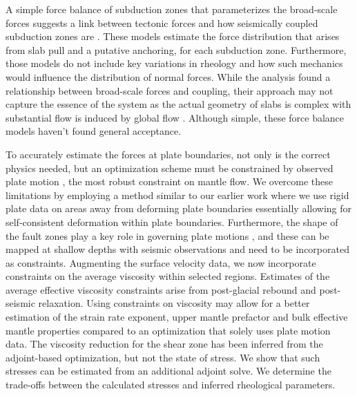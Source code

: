 \documentclass[12pt]{article}
\begin{document}
A simple force balance of subduction zones that parameterizes the broad-scale forces suggests a link between tectonic forces and how seismically coupled subduction zones are \citep{scholz1995mechanism, scholz2012seismic}. These models estimate the force distribution that arises from slab pull and a putative anchoring, for each subduction zone. Furthermore, those models do not include key variations in rheology and how such mechanics would influence the distribution of  normal forces.  While the analysis found a relationship between broad-scale forces and coupling, their approach may not capture the essence of the system as the actual geometry of slabs is complex with substantial flow is induced by global flow \citep{scholz2012seismic}. 
Although simple, these force balance models haven't found general acceptance.


  To accurately estimate the forces at plate boundaries, not only is the correct physics needed, but an optimization scheme must be constrained by observed plate motion \citep{BursteddeStadlerAlisicEtAl13,Stadler27082010}, the most robust constraint on mantle flow. We overcome these limitations by employing a method similar to our earlier work \citep{ratnaswamy2015adjoint} where we use rigid plate data on areas away from deforming plate boundaries essentially allowing for self-consistent deformation within plate boundaries. 
Furthermore, the shape of the fault zones play a key role in governing plate motions \citep{Zhong10021995}, and these can be mapped at shallow depths with seismic observations and need to be incorporated as constraints.
Augmenting the surface velocity data, we now incorporate constraints on the average viscosity within selected regions. Estimates of the average effective viscosity constraints arise from post-glacial rebound and post-seismic relaxation. Using constraints on viscosity may allow for a better estimation of the strain rate exponent, upper mantle prefactor and bulk effective mantle properties compared to an optimization that solely uses plate motion data. 
The viscosity reduction for the shear zone has been inferred from the adjoint-based optimization, but not the state of stress. We show that such stresses can be estimated from an additional adjoint solve.
We determine the trade-offs between the calculated stresses and inferred rheological parameters. 
\end{document}
